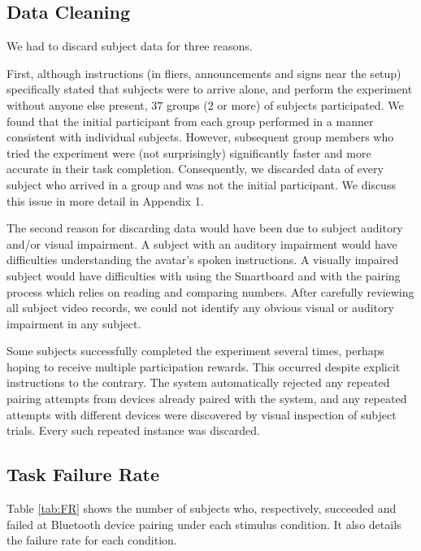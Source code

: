 \documentclass{llncs}
\begin{document}
\subsection{Data Cleaning}
\label{subsec:cleaning}
%
We had to discard subject data for three reasons.

First, although instructions (in fliers, announcements and signs near the setup) specifically 
stated that subjects were to arrive alone, and perform the experiment without anyone else present, 
$37$ groups (2 or more) of subjects participated. We found that the initial participant from each group 
performed in a manner consistent with individual subjects. However, subsequent group members 
who tried the experiment were (not surprisingly) significantly faster and more 
accurate in their task completion. Consequently, we discarded data of every subject who 
arrived in a group and was not the initial participant. We discuss this issue in more detail in Appendix 1.

The second reason for discarding data would have been due to subject auditory and/or visual impairment. 
A subject with an auditory impairment would have difficulties understanding the avatar's 
spoken instructions. A visually impaired subject would have difficulties with using the Smartboard
and with the pairing process which relies on reading and comparing numbers.
After carefully reviewing all subject video records, we could not identify any obvious 
visual or auditory impairment in any subject.

Some subjects successfully completed the experiment several times, perhaps  
hoping to receive multiple participation rewards. This occurred despite explicit 
instructions to the contrary. The system automatically rejected any repeated pairing 
attempts from devices already paired with the system, and any repeated attempts with 
different devices were discovered  by visual inspection of subject trials. Every 
such repeated instance was discarded. 

%

\subsection{Task Failure Rate}
%
Table \ref{tab:FR} shows the number of subjects who, respectively, 
succeeded and failed at Bluetooth device pairing under each 
stimulus condition. It also details the failure rate for each condition.
\end{document}
